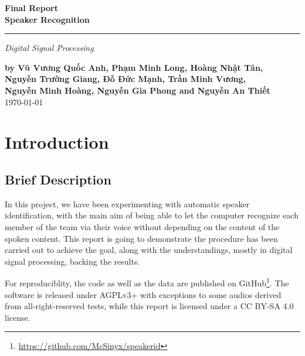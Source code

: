 \documentclass[a4paper,12pt]{article}
\begin{document}
\setcounter{page}{0}
\thispagestyle{empty}
\begin{flushright}
  \setlength{\baselineskip}{1.4\baselineskip}
\textbf{\Huge Final Report\\Speaker Recognition}
  \noindent\rule{\textwidth}{5pt}
  \emph{\Large Digital Signal Processing}

  \textbf{by Vũ Vương Quốc Anh, Phạm Minh Long, Hoàng Nhật Tân,\\
          Nguyễn Trường Giang, Đỗ Đức Mạnh, Trần Minh Vương,\\
          Nguyễn Minh Hoàng, Nguyễn Gia Phong and Nguyễn An Thiết\\}
  \today
\end{flushright}
\pagebreak

\tableofcontents
\pagebreak

\section{Introduction}
\subsection{Brief Description}
In this project, we have been experimenting with automatic speaker
identification, with the main aim of being able to let the computer recognize
each member of the team via their voice without depending on the content of
the spoken content.  This report is going to demonstrate the procedure has been
carried out to achieve the goal, along with the understandings, mostly in
digital signal processing, backing the results.

For reproduciblity, the code as well as the data are published on
GitHub\footnote{\url{https://github.com/McSinyx/speakerid}}.  The software is
released under AGPLv3+ with exceptions to some audios derived from
all-right-reserved tests, while this report is licensed under a CC BY-SA 4.0
license.

\end{document}
